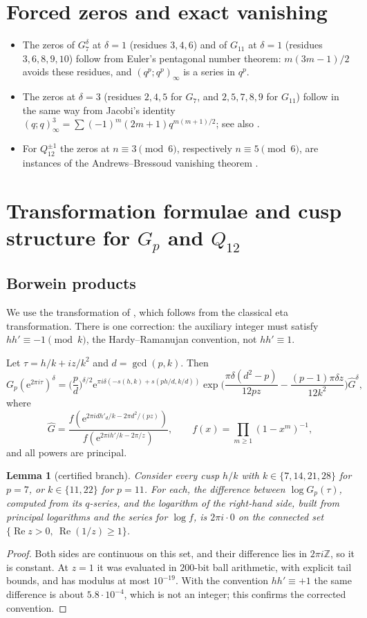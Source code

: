 \documentclass[11pt]{amsart}
\newtheorem{lemma}[theorem]{Lemma}
\theoremstyle{remark}
\theoremstyle{definition}
\newcommand{\Z}{\mathbb Z}
\newcommand{\Rea}{\operatorname{Re}}
\newcommand{\e}{\mathrm e}
\begin{document}
\section{Forced zeros and exact vanishing}\label{sec:zeros}
\begin{itemize}[leftmargin=2em]
\item The zeros of $G_7^\delta$ at $\delta=1$ (residues $3,4,6$) and of $G_{11}$ at $\delta=1$ (residues $3,6,8,9,10$) follow from Euler's pentagonal number theorem: $m(3m-1)/2$ avoids these residues, and $(q^p;q^p)_\infty$ is a series in $q^p$.
\item The zeros at $\delta=3$ (residues $2,4,5$ for $G_7$, and $2,5,7,8,9$ for $G_{11}$) follow in the same way from Jacobi's identity $(q;q)_\infty^3=\sum(-1)^m(2m+1)q^{m(m+1)/2}$; see also \cite[Cor.~13]{SZ}.
\item For $Q_{12}^{\pm1}$ the zeros at $n\equiv3\pmod6$, respectively $n\equiv5\pmod6$, are instances of the Andrews--Bressoud vanishing theorem \cite{AB}.
\end{itemize}

\section{Transformation formulae and cusp structure for $G_p$ and $Q_{12}$}\label{sec:cuspsB}
\subsection{Borwein products}
We use the transformation of \cite[Prop.~7]{SZ}, which follows from the classical eta transformation. There is one correction: the auxiliary integer must satisfy $hh'\equiv-1\pmod k$, the Hardy--Ramanujan convention, not $hh'\equiv1$.

Let $\tau=h/k+iz/k^2$ and $d=\gcd(p,k)$. Then
\[
G_p(\e^{2\pi i\tau})^\delta=\Big(\frac pd\Big)^{\delta/2}\e^{\pi i\delta(-s(h,k)+s(ph/d,k/d))}\exp\Big(\frac{\pi\delta(d^2-p)}{12pz}-\frac{(p-1)\pi\delta z}{12k^2}\Big)\widehat G^\delta,
\]
where
\[
\widehat G=\frac{f(\e^{2\pi idh'_d/k-2\pi d^2/(pz)})}{f(\e^{2\pi ih'/k-2\pi/z})},\qquad f(x)=\prod_{m\ge1}(1-x^m)^{-1},
\]
and all powers are principal.

\begin{lemma}[certified branch]\label{lem:branchG}
Consider every cusp $h/k$ with $k\in\{7,14,21,28\}$ for $p=7$, or $k\in\{11,22\}$ for $p=11$. For each, the difference between $\log G_p(\tau)$, computed from its $q$-series, and the logarithm of the right-hand side, built from principal logarithms and the series for $\log f$, is $2\pi i\cdot0$ on the connected set $\{\Rea z>0,\ \Rea(1/z)\ge1\}$.
\end{lemma}
\begin{proof}
Both sides are continuous on this set, and their difference lies in $2\pi i\Z$, so it is constant. At $z=1$ it was evaluated in $200$-bit ball arithmetic, with explicit tail bounds, and has modulus at most $10^{-19}$. With the convention $hh'\equiv+1$ the same difference is about $5.8\cdot10^{-4}$, which is not an integer; this confirms the corrected convention.
\end{proof}
\end{document}
